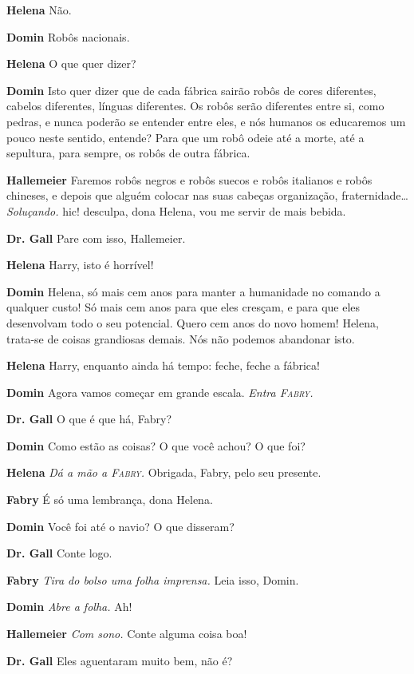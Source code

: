\textbf{Helena} Não.

\textbf{Domin} Robôs nacionais.

\textbf{Helena} O que quer dizer?

\textbf{Domin} Isto quer dizer que de cada fábrica sairão robôs de cores diferentes,
cabelos diferentes, línguas diferentes. Os robôs serão diferentes entre si,
como pedras, e nunca poderão se entender entre eles, e nós humanos os
educaremos um pouco neste sentido, entende? Para que um robô odeie até a
morte, até a sepultura, para sempre, os robôs de outra fábrica.

\textbf{Hallemeier} Faremos robôs negros e robôs suecos e robôs italianos
e robôs chineses, e depois que alguém colocar nas suas cabeças organização,
fraternidade\ldots{} \emph{Soluçando.} hic! desculpa, dona Helena, vou me servir
de mais bebida.

\textbf{Dr. Gall} Pare com isso, Hallemeier.

\textbf{Helena} Harry, isto é horrível!

\textbf{Domin} Helena, só mais cem anos para manter a humanidade no
comando a qualquer custo! Só mais cem anos para que eles cresçam, e para que
eles desenvolvam todo o seu potencial. Quero cem anos do novo homem! Helena,
trata-se de coisas grandiosas demais. Nós não podemos abandonar isto.

\textbf{Helena} Harry, enquanto ainda há tempo: feche, feche a fábrica!

\textbf{Domin} Agora vamos começar em grande escala.
\emph{Entra \textsc{Fabry}.}

\textbf{Dr. Gall} O que é que há, Fabry?

\textbf{Domin} Como estão as coisas? O que você achou? O que foi?

\textbf{Helena} \emph{Dá a mão a \textsc{Fabry}.} Obrigada, Fabry, pelo seu presente.

\textbf{Fabry} É só uma lembrança, dona Helena.

\textbf{Domin} Você foi até o navio? O que disseram?

\textbf{Dr. Gall} Conte logo.

\textbf{Fabry} \emph{Tira do bolso uma folha imprensa.} Leia isso, \mbox{Domin}.

\textbf{Domin} \emph{Abre a folha.} Ah!

\textbf{Hallemeier} \emph{Com sono.} Conte alguma coisa boa!

\textbf{Dr. Gall} Eles aguentaram muito bem, não é?

